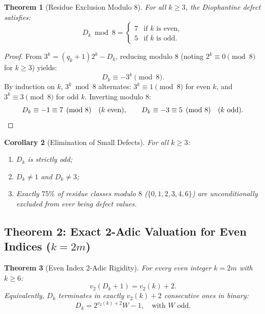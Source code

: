 \documentclass[11pt,reqno]{amsart}
\newtheorem{theorem}{Theorem}[section]
\newtheorem{corollary}[theorem]{Corollary}
\theoremstyle{definition}
\numberwithin{equation}{section}
\begin{document}
\begin{theorem}[Residue Exclusion Modulo 8]\label{thm:mod8}
For all $k \ge 3$, the Diophantine defect satisfies:
\begin{equation}
D_k \bmod 8 = \begin{cases}
7 & \text{if } k \text{ is even}, \\
5 & \text{if } k \text{ is odd}.
\end{cases}
\end{equation}
\end{theorem}

\begin{proof}
From $3^k = (q_k + 1)2^k - D_k$, reducing modulo $8$ (noting $2^k \equiv 0 \pmod 8$ for $k \ge 3$) yields:
\[
D_k \equiv -3^k \pmod 8.
\]
By induction on $k$, $3^k \bmod 8$ alternates: $3^k \equiv 1 \pmod 8$ for even $k$, and $3^k \equiv 3 \pmod 8$ for odd $k$.
Inverting modulo $8$:
\[
D_k \equiv -1 \equiv 7 \pmod 8 \quad (k \text{ even}), \qquad D_k \equiv -3 \equiv 5 \pmod 8 \quad (k \text{ odd}). \qedhere
\]
\end{proof}

\begin{corollary}[Elimination of Small Defects]\label{cor:small_defects}
For all $k \ge 3$:
\begin{enumerate}
    \item $D_k$ is strictly odd;
    \item $D_k \ne 1$ and $D_k \ne 3$;
    \item Exactly $75\%$ of residue classes modulo $8$ ($\{0, 1, 2, 3, 4, 6\}$) are unconditionally excluded from ever being defect values.
\end{enumerate}
\end{corollary}

\subsection{\texorpdfstring{Theorem 2: Exact 2-Adic Valuation for Even Indices ($k = 2m$)}{Theorem 2: Exact 2-Adic Valuation for Even Indices (k = 2m)}}

\begin{theorem}[Even Index 2-Adic Rigidity]\label{thm:even_lte}
For every even integer $k = 2m$ with $k \ge 6$:
\begin{equation}\label{eq:even_valuation}
v_2(D_k + 1) = v_2(k) + 2.
\end{equation}
Equivalently, $D_k$ terminates in exactly $v_2(k) + 2$ consecutive ones in binary:
\begin{equation}
D_k = 2^{v_2(k)+2} W - 1, \quad \text{with } W \text{ odd}.
\end{equation}
\end{theorem}
\end{document}
